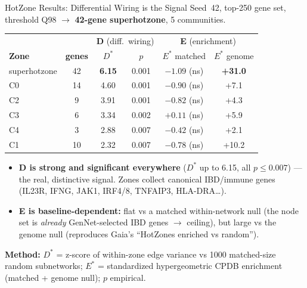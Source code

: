 \documentclass[aspectratio=169]{beamer}
\begin{document}
\begin{frame}{HotZone Results: Differential Wiring is the Signal}
    \small
    Seed~42, top-250 gene set, threshold Q98 $\rightarrow$ \textbf{42-gene superhotzone}, 5 communities.
    \vspace{0.2cm}
    \centering
    \scriptsize
    \renewcommand{\arraystretch}{1.2}
    \begin{tabular}{l c | c c | c c}
        \toprule
        & & \multicolumn{2}{c|}{\textbf{D} (diff.\ wiring)} & \multicolumn{2}{c}{\textbf{E} (enrichment)} \\
        \textbf{Zone} & \textbf{genes} & $D^*$ & $p$ & $E^*$ matched & $E^*$ genome \\
        \midrule
        superhotzone & 42 & \textbf{6.15} & 0.001 & $-1.09$ (ns) & \textbf{+31.0} \\
        C0 & 14 & 4.60 & 0.001 & $-0.90$ (ns) & +7.1 \\
        C2 & 9  & 3.91 & 0.001 & $-0.82$ (ns) & +4.3 \\
        C3 & 6  & 3.34 & 0.002 & $+0.11$ (ns) & +5.9 \\
        C4 & 3  & 2.88 & 0.007 & $-0.42$ (ns) & +2.1 \\
        C1 & 10 & 2.32 & 0.007 & $-0.78$ (ns) & +10.2 \\
        \bottomrule
    \end{tabular}

    \vspace{0.3cm}
    \begin{itemize}
        \footnotesize
        \item \textbf{D is strong and significant everywhere} ($D^*$ up to 6.15, all $p\le0.007$) ---
              the real, distinctive signal. Zones collect canonical IBD/immune genes (IL23R, IFNG, JAK1, IRF4/8, TNFAIP3, HLA-DRA\dots).
        \item \textbf{E is baseline-dependent:} flat vs a matched within-network null (the node set is
              \emph{already} GenNet-selected IBD genes $\rightarrow$ ceiling), but large vs the genome null
              (reproduces Gaia's ``HotZones enriched vs random'').
    \end{itemize}
    \vspace{0.1cm}
    \centering\scriptsize
    \textbf{Method:} $D^*$ = z-score of within-zone edge variance vs 1000 matched-size random subnetworks;
    $E^*$ = standardized hypergeometric CPDB enrichment (matched + genome null); $p$ empirical.
\end{frame}
\end{document}
